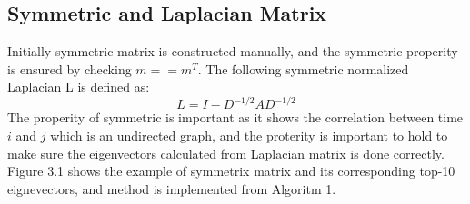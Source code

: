 \documentclass[final]{siamltexmm}
\begin{document}
\subsection{Symmetric and Laplacian Matrix}
Initially symmetric matrix is constructed manually, and the symmetric properity is ensured by checking $m == m^T$. The following symmetric normalized Laplacian L is defined as:
\begin{equation}
L = I - D^{-1/2}AD^{-1/2}
\end{equation}
The properity of symmetric is important as it shows the correlation between time $i$ and $j$ which is an undirected graph, and the proterity is important to hold to make sure the eigenvectors calculated from Laplacian matrix is done correctly. Figure 3.1 shows the example of symmetrix matrix and its corresponding top-10 eignevectors, and method is implemented from Algoritm 1.
\end{document}

